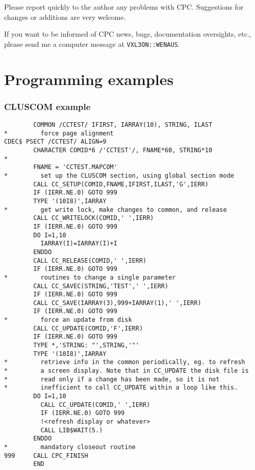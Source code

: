 Please report quickly to the author any problems with CPC. Suggestions
for changes or additions are very welcome.

If you want to be informed of CPC news, bugs, documentation oversights, etc.,
please send me a computer message at
{\tt VXL3ON::WENAUS}.

\newpage
\part{Programming examples}
\section{CLUSCOM example}

\begin{verbatim}
        COMMON /CCTEST/ IFIRST, IARRAY(10), STRING, ILAST
*         force page alignment
CDEC$ PSECT /CCTEST/ ALIGN=9
        CHARACTER COMID*6 /'CCTEST'/, FNAME*60, STRING*10
*
        FNAME = 'CCTEST.MAPCOM'
*         set up the CLUSCOM section, using global section mode
        CALL CC_SETUP(COMID,FNAME,IFIRST,ILAST,'G',IERR)
        IF (IERR.NE.0) GOTO 999
        TYPE '(10I8)',IARRAY
*         get write lock, make changes to common, and release
        CALL CC_WRITELOCK(COMID,' ',IERR)
        IF (IERR.NE.0) GOTO 999
        DO I=1,10
          IARRAY(I)=IARRAY(I)+I
        ENDDO
        CALL CC_RELEASE(COMID,' ',IERR)
        IF (IERR.NE.0) GOTO 999
*         routines to change a single parameter
        CALL CC_SAVEC(STRING,'TEST',' ',IERR)
        IF (IERR.NE.0) GOTO 999
        CALL CC_SAVE(IARRAY(3),999+IARRAY(1),' ',IERR)
        IF (IERR.NE.0) GOTO 999
*         force an update from disk
        CALL CC_UPDATE(COMID,'F',IERR)
        IF (IERR.NE.0) GOTO 999
        TYPE *,'STRING: "',STRING,'"'
        TYPE '(10I8)',IARRAY
*         retrieve info in the common periodically, eg. to refresh
*         a screen display. Note that in CC_UPDATE the disk file is
*         read only if a change has been made, so it is not
*         inefficient to call CC_UPDATE within a loop like this.
        DO I=1,10
          CALL CC_UPDATE(COMID,' ',IERR)
          IF (IERR.NE.0) GOTO 999
          !<refresh display or whatever>
          CALL LIB$WAIT(5.)
        ENDDO
*         mandatory closeout routine
999     CALL CPC_FINISH
        END
\end{verbatim}


